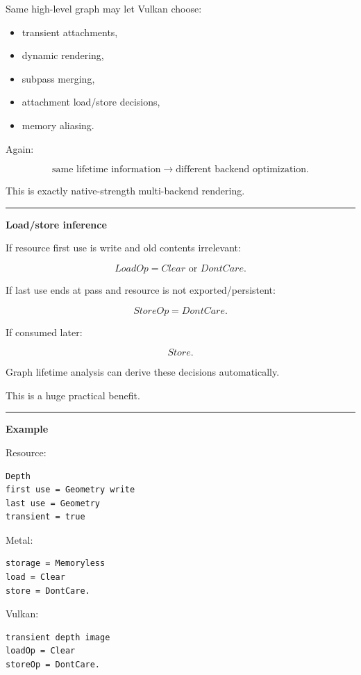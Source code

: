 Same high-level graph may let Vulkan choose:

\begin{itemize}
\tightlist
\item
  transient attachments,
\item
  dynamic rendering,
\item
  subpass merging,
\item
  attachment load/store decisions,
\item
  memory aliasing.
\end{itemize}

Again:

\[
\boxed{
\text{same lifetime information}
\rightarrow
\text{different backend optimization}.
}
\]

This is exactly native-strength multi-backend rendering.

\begin{center}\rule{0.5\linewidth}{0.5pt}\end{center}

\textbf{Load/store inference}

If resource first use is write and old contents irrelevant:

\[
LoadOp=
Clear
\text{ or }
DontCare.
\]

If last use ends at pass and resource is not exported/persistent:

\[
StoreOp=
DontCare.
\]

If consumed later:

\[
Store.
\]

Graph lifetime analysis can derive these decisions automatically.

This is a huge practical benefit.

\begin{center}\rule{0.5\linewidth}{0.5pt}\end{center}

\textbf{Example}

Resource:

\begin{verbatim}
Depth
first use = Geometry write
last use = Geometry
transient = true
\end{verbatim}

Metal:

\begin{verbatim}
storage = Memoryless
load = Clear
store = DontCare.
\end{verbatim}

Vulkan:

\begin{verbatim}
transient depth image
loadOp = Clear
storeOp = DontCare.
\end{verbatim}

